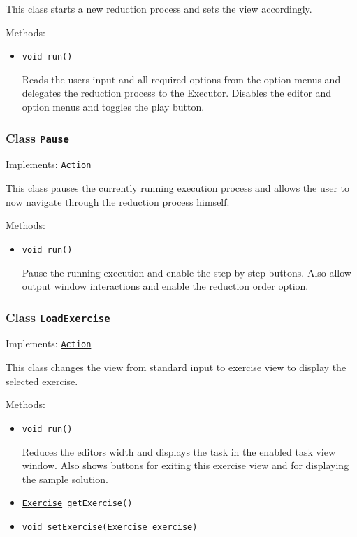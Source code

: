 This class starts a new reduction process and sets the view accordingly.

Methods:
\begin{itemize}
\item \texttt{void run()}

Reads the users input and all required options from the option menus and
 delegates the reduction process to the Executor. Disables the editor and
 option menus and toggles the play button.

\end{itemize}

\subsubsection{Class \texttt{Pause}}
\label{type:edu.kit.wavelength.client.view.action.Pause}
Implements: \texttt{\hyperref[type:edu.kit.wavelength.client.view.action.Action]{Action}}

This class pauses the currently running execution process and allows the user
 to now navigate through the reduction process himself.

Methods:
\begin{itemize}
\item \texttt{void run()}

Pause the running execution and enable the step-by-step buttons. Also allow
 output window interactions and enable the reduction order option.

\end{itemize}

\subsubsection{Class \texttt{LoadExercise}}
\label{type:edu.kit.wavelength.client.view.action.LoadExercise}
Implements: \texttt{\hyperref[type:edu.kit.wavelength.client.view.action.Action]{Action}}

This class changes the view from standard input to exercise view to display
 the selected exercise.

Methods:
\begin{itemize}
\item \texttt{void run()}

Reduces the editors width and displays the task in the enabled task view
 window. Also shows buttons for exiting this exercise view and for displaying
 the sample solution.

\item \texttt{\hyperref[type:edu.kit.wavelength.client.view.exercise.Exercise]{Exercise} getExercise()}



\item \texttt{void setExercise(\hyperref[type:edu.kit.wavelength.client.view.exercise.Exercise]{Exercise} exercise)}



\end{itemize}

